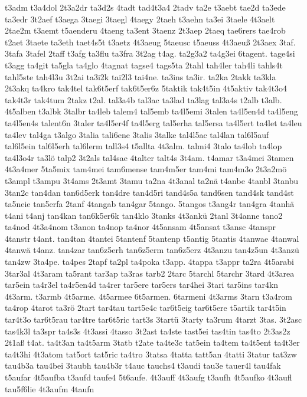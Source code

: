 {t3adm
t3a4dol
2t3a2dr
ta3d2s
4tadt
tad4t3a4
2tadv
ta2e
t3aebt
tae2d
ta3ede
ta3edr
3t2aef
t3aega
3taegi
3taegl
4taegy
2taeh
t3aehn
ta3ei
3taele
4t3aelt
2tae2m
t3aemt
t5aenderu
4taeng
ta3ent
3taenz
2t3aep
2taeq
tae6rers
tae4rob
t2aet
3taete
ta3eth
taet4s5t
t3aetz
4t3aeug
5taeusc
t5aeuss
4t3aeuß
2t3aex
3taf.
3tafa
3tafel
2taff
t3afg
ta3flu
ta3fra
3t2ag
t4ag.
ta2g3a2
ta4g3ei
6tagent.
tage4si
t3agg
ta4git
ta5gla
ta4glo
4tagnat
tagse4
tags5ta
2tahl
tah4ler
tah4li
tahls4t
tahl5ste
tah4l3u
3t2ai
ta3i2k
tai2l3
tai4ne.
ta3ins
ta3ir.
ta2ka
2takk
ta3kla
2t3akq
ta4kro
tak4tel
tak6t5erf
tak6t5er6z
5taktik
tak4t5in
4t5aktiv
tak4t3o4
tak4t3r
tak4tum
2takz
t2al.
tal3a4b
tal3ac
ta3lad
ta3lag
tal3a4s
t2alb
t3alb.
4t5alben
t3albk
3talbr
ta4leb
talem4
tal5emb
ta4l5emi
3talen
ta4l5en4d
ta4l5eng
ta4l5en4s
talent6n
3taler
ta4l5er4f
ta4l5erg
tal5erha
tal5ersa
ta4l5ert
ta4let
ta4leu
ta4lev
tal4ga
t3algo
3talia
tali6ene
3talis
3talke
tal4l5ac
tal4lan
tal6l5auf
tal6l5ein
tal6l5erh
tal6lerm
tall3s4
t5allta
4t3alm.
talmi4
3talo
ta4lob
ta4lop
ta4l3o4r
ta3lö
talp2
3t2als
tal4sae
4talter
talt4s
3t4am.
t4amar
t3a4mei
3tamen
4t3a4mer
5ta5mix
tam4mei
tam6mense
tam4m5er
tam4mi
tam4m3o
2t3a2mö
t3ampl
t3ampu
3t4ams
2t3amt
3tamu
ta2na
4t3anal
ta2nä
t4anbe
4tanbl
3tanbu
3tan2c
tan4dan
tan6d5erk
tan4dre
tan4d5ri
tand4s5a
tand6sen
tand4sk
tand4st
ta5neie
tan5erfa
2tanf
4tangab
tan4gar
5tango.
5tangos
t3ang4r
tan4gra
4tanhä
t4ani
t4anj
tan4kan
tan6k5er6k
tan4klo
3tanks
4t3ankü
2tanl
3t4anne
tano2
ta4nod
4t3a4nom
t3anon
ta4nop
ta4nor
4t5ansam
4t5ansat
t3ansc
4tanspr
4tanstr
t4ant.
tan4tan
4tantei
5tantenf
5tantenp
t5antig
5tantis
4tanwae
4tanwal
4tanwä
t4anz.
tan4zar
tan6z5erh
tan6z5erm
tan6z5erz
4t3anzu
tan4z5un
4t3anzü
tan4zw
3ta4pe.
ta4pes
2tapf
ta2pl
ta4poka
t3app.
4tappa
t3appr
ta2ra
4t5arabi
3tar3al
4t3aram
ta5rant
tar3ap
ta3ras
tarb2
2tarc
5tarchl
5tarchr
3tard
4t3area
tar5ein
ta4r3el
ta4r5en4d
ta4rer
tar5ere
tar5ers
tar4hei
3tari
tar5ins
tar4kn
4t3arm.
t3armb
4t5arme.
4t5armee
6t5armen.
6tarmeni
4t3arms
3tarn
t3a4rom
ta4rop
4tarot
ta3rö
2tart
tar4tau
tart5e4c
tar6t5eig
tar6t5ere
t5artik
tar4t5in
tar4t3o
tar6t5rau
tar4tre
tar6t5ric
tart3s
3tartü
3tarty
ta3rum
4tarzt
3tas.
3t2asc
tas4k3l
ta3spr
ta4s3s
4t3assi
4tasso
3t2ast
ta4ste
tast5ei
tas4tin
tas4to
2t3as2z
2t1aß
t4at.
ta4t3an
ta4t5arm
3tatb
t2ate
ta4te3c
tat5ein
ta4tem
ta4t5ent
ta4t3er
ta4t3hi
4t3atom
tat5ort
tat5ric
ta4tro
3tatsa
4tatta
tatt5an
4tatti
3tatur
tat3zw
tau4b3a
tau4bei
3taubh
tau4b3r
t4auc
tauchs4
t3audi
tau3e
tauer4l
tau4fak
t5aufar
4t5aufba
t3aufd
taufe4
5t6aufe.
4t3auff
4t3aufg
t3aufh
4t5aufko
4t3aufl
tau5f6lie
4t3aufm
4taufn
}

